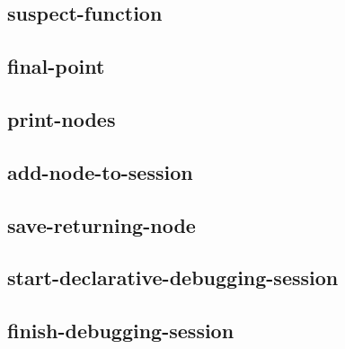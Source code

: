 \subsection{suspect-function}
\subsection{final-point}
\subsection{print-nodes}
\subsection{add-node-to-session}
\subsection{save-returning-node}
\subsection{start-declarative-debugging-session}
\subsection{finish-debugging-session}


